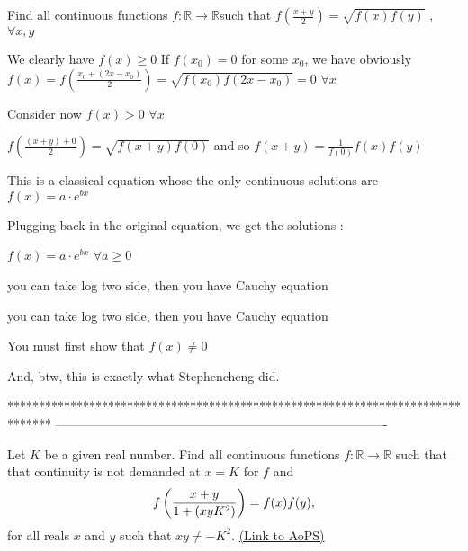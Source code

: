 \begin{solution}
	\begin{tcolorbox}Find all continuous functions $ f: \mathbb{R} \to \mathbb{R}$such that $ f\left( {\frac {{x + y}} {2}} \right) = \sqrt {f(x)f(y)}$      , $ \forall x,y$\end{tcolorbox}

We clearly have $ f(x)\geq 0$
If $ f(x_0)=0$ for some $ x_0$, we have obviously $ f(x)=f(\frac{x_0+(2x-x_0)}{2})=\sqrt{f(x_0)f(2x-x_0)}=0$ $ \forall x$

Consider now $ f(x)>0$ $ \forall x$

$ f(\frac{(x+y)+0}{2})=\sqrt{f(x+y)f(0)}$ and so $ f(x+y)=\frac{1}{f(0)}f(x)f(y)$

This is a classical equation whose the only continuous solutions are $ f(x)=a\cdot e^{bx}$

Plugging back in the original equation, we get the solutions :

$ f(x)=a\cdot e^{bx}$ $ \forall a\geq 0$
\end{solution}



\begin{solution}
	you can take log two side, then you have Cauchy equation
\end{solution}



\begin{solution}
	\begin{tcolorbox}you can take log two side, then you have Cauchy equation\end{tcolorbox}

You must first show that $ f(x)\neq 0$

And, btw, this is exactly what Stephencheng did.  
\end{solution}
*******************************************************************************
-------------------------------------------------------------------------------

\begin{problem}
	Let $K$ be a given real number. Find all continuous functions $ f: \mathbb{R} \to \mathbb{R}$ such that that continuity is not demanded at $ x=K$ for $f$ and \[ f\left( {\frac {{x + y}} {{1 + (xy\/K^2 )}}} \right) = f(x)f(y),\] for all reals $x$ and $y$ such that $xy\neq -K^2$.
	\flushright \href{https://artofproblemsolving.com/community/c6h277432}{(Link to AoPS)}
\end{problem}




